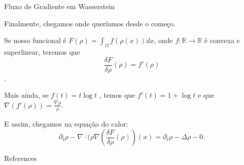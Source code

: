 \documentclass[10pt]{beamer}
\begin{document}
\begin{frame}[fragile]{Fluxo de Gradiente em Wasserstein}

	Finalmente, chegamos onde queríamos desde o começo.

	Se nosso funcional é $F(\rho)=\int_\Omega f(\rho(x))dx$, onde $f:\mathbb R \to \mathbb R$
	é convexa e superlinear, teremos que
	\begin{equation}
		\frac{\delta F}{\delta \rho}(\rho) = f'(\rho)
	\end{equation}.

	Mais ainda, se $f(t) = t \log t $ , temos que $f'(t) = 1+ \log t$ e que
	$\nabla(f'(\rho))=\frac{\nabla \rho}{\rho}$.

	E assim, chegamos na equação do calor:
	\begin{equation}
		\partial_t \rho - \nabla \cdot (\rho \nabla (\frac{\delta F}{\delta \rho}(\rho))(x) =
	\partial_t \rho - \Delta \rho -0.
	\end{equation}


\end{frame}

\begin{frame}[allowframebreaks]{References}
	\nocite{*}

  \renewcommand{\section}[2]{}%
\tiny{}

\end{frame}
\end{document}
